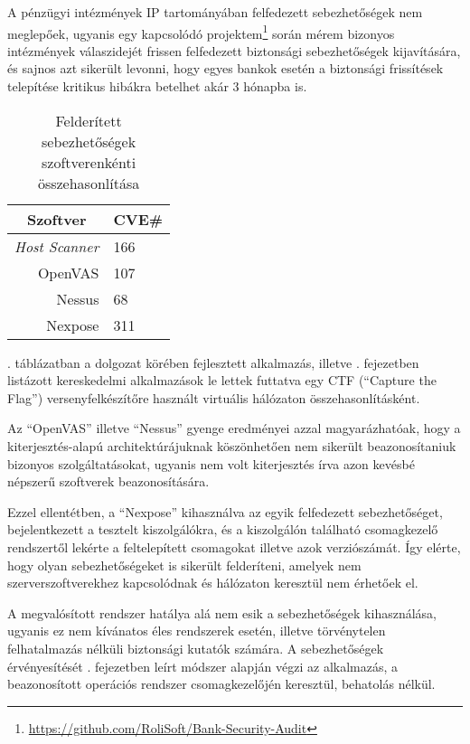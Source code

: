 	A pénzügyi intézmények IP tartományában felfedezett sebezhetőségek nem meglepőek, ugyanis egy kapcsolódó projektem\footnote{\url{https://github.com/RoliSoft/Bank-Security-Audit}} során mérem bizonyos intézmények válaszidejét frissen felfedezett biztonsági sebezhetőségek kijavítására, és sajnos azt sikerült levonni, hogy egyes bankok esetén a biztonsági frissítések telepítése kritikus hibákra betelhet akár 3 hónapba is.
	
	\begin{table}[H]
		\centering
		\begin{tabular}{|r|l|}
			\hline
			\multicolumn{1}{|c|}{\textbf{Szoftver}} & \multicolumn{1}{c|}{\textbf{CVE\#}} \\ \hline
			\textit{Host Scanner\footnotemark{}}                   & 166                                 \\
			OpenVAS                                 & 107                                 \\
			Nessus                                  & 68                                  \\
			Nexpose                                 & 311                                 \\ \hline
		\end{tabular}
		\caption{Felderített sebezhetőségek szoftverenkénti összehasonlítása}
		\label{foundvulns_hu}
	\end{table}
	
	\Az{\ref{foundvulns_hu}}. táblázatban a dolgozat körében fejlesztett alkalmazás, illetve \az{\ref{comtools}}. fejezetben listázott kereskedelmi alkalmazások le lettek futtatva egy CTF (``Capture the Flag'') versenyfelkészítőre használt virtuális hálózaton összehasonlításként.
	
	Az ``OpenVAS'' illetve ``Nessus'' gyenge eredményei azzal magyarázhatóak, hogy a kiterjesztés-alapú architektúrájuknak köszönhetően nem sikerült beazonosítaniuk bizonyos szolgáltatásokat, ugyanis nem volt kiterjesztés írva azon kevésbé népszerű szoftverek beazonosítására.
	
	Ezzel ellentétben, a ``Nexpose'' kihasználva az egyik felfedezett sebezhetőséget, bejelentkezett a tesztelt kiszolgálókra, és a kiszolgálón található csomagkezelő rendszertől lekérte a feltelepített csomagokat illetve azok verziószámát. Így elérte, hogy olyan sebezhetőségeket is sikerült felderíteni, amelyek nem szerverszoftverekhez kapcsolódnak és hálózaton keresztül nem érhetőek el.
	
	A megvalósított rendszer hatálya alá nem esik a sebezhetőségek kihasználása, ugyanis ez nem kívánatos éles rendszerek esetén, illetve törvénytelen felhatalmazás nélküli biztonsági kutatók számára. A sebezhetőségek érvényesítését \az{\ref{vulnvalid}}. fejezetben leírt módszer alapján végzi az alkalmazás, a beazonosított operációs rendszer csomagkezelőjén keresztül, behatolás nélkül.
